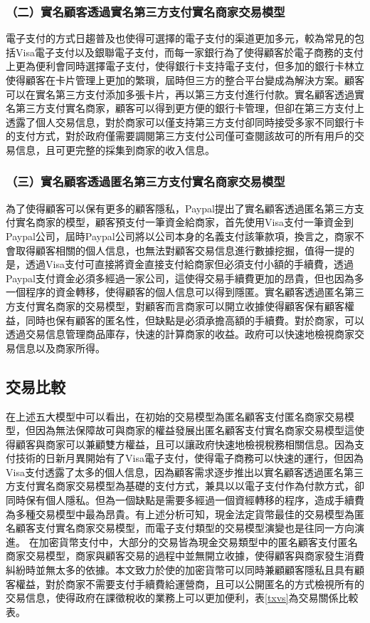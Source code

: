 		\subsubsection{（二）實名顧客透過實名第三方支付實名商家交易模型}
		電子支付的方式日趨普及也使得可選擇的電子支付的渠道更加多元，較為常見的包括Visa電子支付以及銀聯電子支付，而每一家銀行為了使得顧客於電子商務的支付上更為便利會同時選擇電子支付，使得銀行卡支持電子支付，但多加的銀行卡林立使得顧客在卡片管理上更加的繁瑣，屆時但三方的整合平台變成為解決方案。顧客可以在實名第三方支付添加多張卡片，再以第三方支付進行付款。實名顧客透過實名第三方支付實名商家，顧客可以得到更方便的銀行卡管理，但卻在第三方支付上透露了個人交易信息，對於商家可以僅支持第三方支付卻同時接受多家不同銀行卡的支付方式，對於政府僅需要調閱第三方支付公司僅可查閱該故可的所有用戶的交易信息，且可更完整的採集到商家的收入信息。
		
		\subsubsection{（三）實名顧客透過匿名第三方支付實名商家交易模型}
		為了使得顧客可以保有更多的顧客隱私，Paypal提出了實名顧客透過匿名第三方支付實名商家的模型，顧客預支付一筆資金給商家，首先使用Visa支付一筆資金到Paypal公司，屆時Paypal公司將以公司本身的名義支付該筆款項，換言之，商家不會取得顧客相關的個人信息，也無法對顧客交易信息進行數據挖掘，值得一提的是，透過Visa支付可直接將資金直接支付給商家但必須支付小額的手續費，透過Paypal支付資金必須多經過一家公司，這使得交易手續費更加的昂貴，但也因為多一個程序的資金轉移，使得顧客的個人信息可以得到隱匿。實名顧客透過匿名第三方支付實名商家的交易模型，對顧客而言商家可以開立收據使得顧客保有顧客權益，同時也保有顧客的匿名性，但缺點是必須承擔高額的手續費。對於商家，可以透過交易信息管理商品庫存，快速的計算商家的收益。政府可以快速地檢視商家交易信息以及商家所得。

		\subsection{交易比較}
		在上述五大模型中可以看出，在初始的交易模型為匿名顧客支付匿名商家交易模型，但因為無法保障故可與商家的權益發展出匿名顧客支付實名商家交易模型這使得顧客與商家可以兼顧雙方權益，且可以讓政府快速地檢視稅務相關信息。因為支付技術的日新月異開始有了Visa電子支付，使得電子商務可以快速的運行，但因為Visa支付透露了太多的個人信息，因為顧客需求逐步推出以實名顧客透過匿名第三方支付實名商家交易模型為基礎的支付方式，兼具以以電子支付作為付款方式，卻同時保有個人隱私。但為一個缺點是需要多經過一個資經轉移的程序，造成手續費為多種交易模型中最為昂貴。有上述分析可知，現金法定貨幣最佳的交易模型為匿名顧客支付實名商家交易模型，而電子支付類型的交易模型演變也是往同一方向演進。
		在加密貨幣支付中，大部分的交易皆為現金交易類型中的匿名顧客支付匿名商家交易模型，商家與顧客交易的過程中並無開立收據，使得顧客與商家發生消費糾紛時並無太多的依據。本文致力於使的加密貨幣可以同時兼顧顧客隱私且具有顧客權益，對於商家不需要支付手續費給運營商，且可以公開匿名的方式檢視所有的交易信息，使得政府在課徵稅收的業務上可以更加便利，表\ref{txvs}為交易關係比較表。


